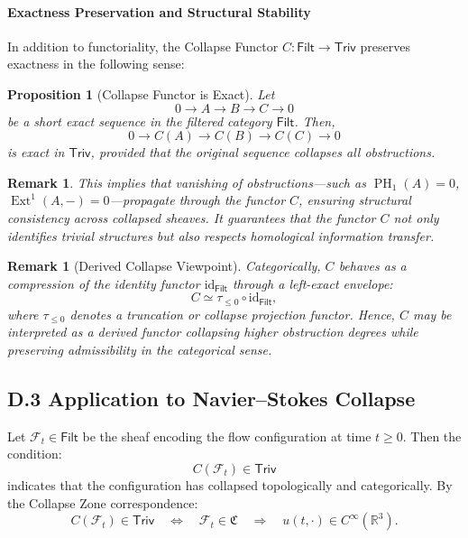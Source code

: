 \documentclass[11pt]{article}
\newtheorem{proposition}[theorem]{Proposition}
\newtheorem{remark}[theorem]{Remark}
\DeclareMathOperator{\Ext}{Ext}
\DeclareMathOperator{\PH}{PH}
\begin{document}
\paragraph{Exactness Preservation and Structural Stability}

In addition to functoriality, the Collapse Functor \( C: \mathsf{Filt} \to \mathsf{Triv} \) preserves exactness in the following sense:

\begin{proposition}[Collapse Functor is Exact]
Let
\[
0 \longrightarrow A \longrightarrow B \longrightarrow C \longrightarrow 0
\]
be a short exact sequence in the filtered category \( \mathsf{Filt} \). Then,
\[
0 \longrightarrow C(A) \longrightarrow C(B) \longrightarrow C(C) \longrightarrow 0
\]
is exact in \( \mathsf{Triv} \), provided that the original sequence collapses all obstructions.
\end{proposition}

\begin{remark}
This implies that vanishing of obstructions---such as \( \PH_1(A) = 0 \), \( \Ext^1(A, -) = 0 \)---propagate through the functor \( C \), ensuring structural consistency across collapsed sheaves. It guarantees that the functor \( C \) not only identifies trivial structures but also respects homological information transfer.
\end{remark}

\begin{remark}[Derived Collapse Viewpoint]
Categorically, \( C \) behaves as a compression of the identity functor \( \mathrm{id}_{\mathsf{Filt}} \) through a left-exact envelope:
\[
C \simeq \tau_{\leq 0} \circ \mathrm{id}_{\mathsf{Filt}},
\]
where \( \tau_{\leq 0} \) denotes a truncation or collapse projection functor. Hence, \( C \) may be interpreted as a derived functor collapsing higher obstruction degrees while preserving admissibility in the categorical sense.
\end{remark}


\subsection{D.3 Application to Navier–Stokes Collapse}

Let \( \mathcal{F}_t \in \mathsf{Filt} \) be the sheaf encoding the flow configuration at time \( t \geq 0 \). Then the condition:
\[
C(\mathcal{F}_t) \in \mathsf{Triv}
\]
indicates that the configuration has collapsed topologically and categorically. By the Collapse Zone correspondence:
\[
C(\mathcal{F}_t) \in \mathsf{Triv} \quad \Leftrightarrow \quad \mathcal{F}_t \in \mathfrak{C} \quad \Rightarrow \quad u(t,\cdot) \in C^\infty(\mathbb{R}^3).
\]
\end{document}
